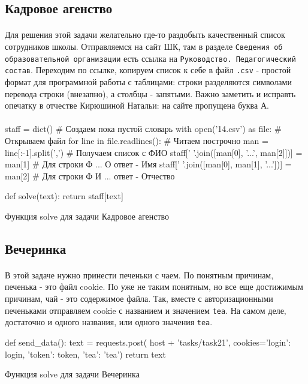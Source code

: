 \documentclass[12pt]{article}
\begin{document}
    \subsection{Кадровое агенство}
    \paragraph{}
    Для решения этой задачи желательно где-то раздобыть качественный список сотрудников школы.
    Отправляемся на сайт ШК, там в разделе \verb|Сведения об образовательной организации| есть ссылка на \verb|Руководство. Педагогический состав|.
    Переходим по ссылке, копируем список к себе в файл \verb|.csv| - простой формат для программной работы с таблицами:
    строки разделяются символами перевода строки (внезапно), а столбцы - запятыми.
    Важно заметить и исправть опечатку в отчестве Кирюшиной Натальи: на сайте пропущена буква А.
    \paragraph{}

    \begin{listing}[H]
        \begin{pythoncode}
staff = dict()                                            # Создаем пока пустой словарь
with open('14.csv') as file:                              # Открываем файл
    for line in file.readlines():                         # Читаем построчно
        man = line[:-1].split(',')                        # Получаем список с ФИО
        staff[' '.join([man[0], '...', man[2]])] = man[1] # Для строки Ф ... О ответ - Имя
        staff[' '.join([man[0], man[1], '...'])] = man[2] # Для строки Ф И ... ответ - Отчество

def solve(text):
    return staff[text]
        \end{pythoncode}
        \label{lst:solve14}
        \caption{Функция solve для задачи Кадровое агенство}
    \end{listing}


    \subsection{Вечеринка}
    \paragraph{}
    В этой задаче нужно принести печеньки с чаем.
    По понятным причинам, печенька - это файл cookie.
    По уже не таким понятным, но все еще достижимым причинам, чай - это содержимое файла.
    Так, вместе с авторизационными печеньками отправляем cookie с названием и значением \verb|tea|.
    На самом деле, достаточно и одного названия, или одного значения \verb|tea|.
    \begin{listing}[H]
        \begin{pythoncode}
def send_data():
    text = requests.post(
        host + 'tasks/task21',
        cookies={'login': login, 'token': token, 'tea': 'tea'})
    return text
        \end{pythoncode}
        \label{lst:solve21}
        \caption{Функция solve для задачи Вечеринка}
    \end{listing}
\end{document}
